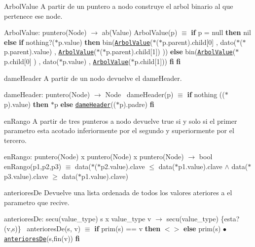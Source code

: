 \begin{DoxyParagraph}{Arbol\+Value}
A partir de un puntero a nodo construye el arbol binario al que pertenece ese node.

Arbol\+Value\+: puntero(\+Node) $\to$ ab(\+Value) Arbol\+Value(p) $\equiv$ {\bfseries if} p = null {\bfseries then} nil {\bfseries else} {\bfseries if} nothing?($\ast$p.value) {\bfseries then} bin(\href{axiomas.html#ArbolValue}{\tt Arbol\+Value}($\ast$($\ast$p.parent).child\mbox{[}0\mbox{]} , dato($\ast$($\ast$p.parent).value) , \href{axiomas.html#ArbolValue}{\tt Arbol\+Value}($\ast$($\ast$p.parent).child\mbox{[}1\mbox{]}) )) {\bfseries else} bin(\href{axiomas.html#ArbolValue}{\tt Arbol\+Value}($\ast$p.child\mbox{[}0\mbox{]} ) , dato($\ast$p.value) , \href{axiomas.html#ArbolValue}{\tt Arbol\+Value}($\ast$p.child\mbox{[}1\mbox{]})) {\bfseries fi} {\bfseries fi} 
\end{DoxyParagraph}


\begin{DoxyParagraph}{dame\+Header}
A partir de un nodo devuelve el dame\+Header.

dame\+Header\+: puntero(\+Node) $\to$ Node~\newline
 dame\+Header(p) $\equiv$ {\bfseries if} nothing (($\ast$p).value) {\bfseries then} $\ast$p {\bfseries else} \href{axiomas.html#dameHeader}{\tt dame\+Header}(($\ast$p).padre) {\bfseries fi} 
\end{DoxyParagraph}


\begin{DoxyParagraph}{en\+Rango}
A partir de tres punteros a nodo devuelve true si y solo si el primer parametro esta acotado inferiormente por el segundo y superiormente por el tercero.

en\+Rango\+: puntero(\+Node) x puntero(\+Node) x puntero(\+Node) $\to$ bool~\newline
 en\+Rango(p1,p2,p3) $\equiv$ data($\ast$($\ast$p2.value).clave $\leq$ data($\ast$p1.value).clave $\land$ data($\ast$p3.value).clave $\geq$ data($\ast$p1.value).clave) 
\end{DoxyParagraph}


\begin{DoxyParagraph}{anteriores\+De}
Devuelve una lista ordenada de todos los valores ateriores a el parametro que recive.

anteriores\+De\+: secu(value\+\_\+type) s x value\+\_\+type v $\to$ secu(value\+\_\+type) \{esta?(v,s)\}~\newline
 anteriores\+De(s, v) $\equiv$ {\bfseries if} prim(s) == v {\bfseries then} $<$$>$ {\bfseries else} prim(s) $\bullet$ \href{axiomas.html#anterioresDe}{\tt anteriores\+De}(s,fin(v)) {\bfseries fi} 
\end{DoxyParagraph}


